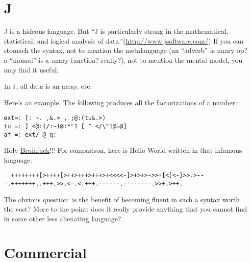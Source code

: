 \chapter{J}

J is a hideous language.  But ``J is particularly strong in the
mathematical, statistical, and logical analysis of
data.''(\url{http://www.jsoftware.com/}) If you can stomach the
syntax, not to mention the metalanguage (an ``adverb'' is unary op? a
``monad'' is a unary function? really?), not to mention the mental
model, you may find it useful.

In J, all data is an array.  etc.

Here's an example.  The following produces all the factorizations of a
number:

\begin{verbatim}
ext=: [: ~. ,&.> , ;@:(tu&.>)
tu =: ] <@:(/:~)@:*"1 [ ^ </\"1@=@]
af =: ext/ @ q:
\end{verbatim}

Holy \href{http://www.muppetlabs.com/~breadbox/bf/}{Brainfuck}!!!  For comparison, here is Hello World
written in that infamous language:

\begin{verbatim}
  ++++++++[>++++[>++>+++>+++>+<<<<-]>+>+>->>+[<]<-]>>.>---.+++++++..+++.>>.<-.<.+++.------.--------.>>+.>++.
\end{verbatim}

The obvious question: is the benefit of becoming fluent in such a
syntax worth the cost?  More to the point: does it really provide
anything that you cannot find in some other less alienating language?

\chapter{Commercial}

